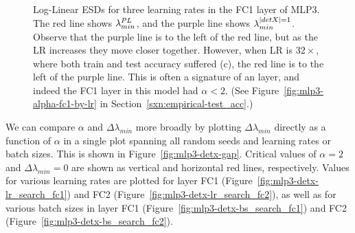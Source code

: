 \begin{figure}[t] %
    \centering
    \caption{
        Log-Linear ESDs for three learning rates in the FC1 layer of MLP3. The red line shows $\lambda^{PL}_{min}$, and the 
        purple line shows $\lambda^{\vert detX\vert=1}_{min}$. Observe that the purple line is to the left of the red line, but as the LR 
        increases they move closer together. However, when LR is $32\times$, where both 
        train and test accuracy suffered (c), the red line is to the left of the purple line. This is often a signature 
        of an \OverRegularized layer, and indeed the FC1 layer in this model had $\alpha < 2$. (See Figure~\ref{fig:mlp3-alpha-fc1-by-lr} in 
        Section~\ref{sxn:empirical-test_acc}.)
    }
    \label{fig:mlp3-tracelognorm}
\end{figure}


We can compare  $\alpha$ and $\Delta \lambda_{min}$ more broadly by plotting $\Delta \lambda_{min}$ directly as a function of $\alpha$ in a single plot spanning all random seeds and learning rates or batch sizes.
This is shown in Figure~\ref{fig:mlp3-detx-gap}. 
Critical values of $\alpha=2$ and $\Delta \lambda_{min} = 0$ are shown as vertical and horizontal red lines, respectively. 
Values for various learning rates are plotted for layer FC1 
(Figure~\ref{fig:mlp3-detx-lr_search_fc1}) and FC2 (Figure~\ref{fig:mlp3-detx-lr_search_fc2}), as well as for various batch sizes in layer FC1 (Figure~\ref{fig:mlp3-detx-bs_search_fc1}) and FC2 (Figure~\ref{fig:mlp3-detx-bs_search_fc2}).

